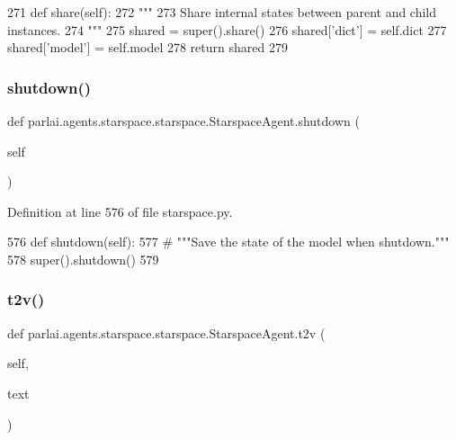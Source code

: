 \begin{DoxyCode}
271     \textcolor{keyword}{def }share(self):
272         \textcolor{stringliteral}{"""}
273 \textcolor{stringliteral}{        Share internal states between parent and child instances.}
274 \textcolor{stringliteral}{        """}
275         shared = super().share()
276         shared[\textcolor{stringliteral}{'dict'}] = self.dict
277         shared[\textcolor{stringliteral}{'model'}] = self.model
278         \textcolor{keywordflow}{return} shared
279 
\end{DoxyCode}
\mbox{\label{classparlai_1_1agents_1_1starspace_1_1starspace_1_1StarspaceAgent_a4016a83cf0ed9ed97c8b94d9eacbcae3}} 
\subsubsection{\texorpdfstring{shutdown()}{shutdown()}}
{\footnotesize\ttfamily def parlai.\+agents.\+starspace.\+starspace.\+Starspace\+Agent.\+shutdown (\begin{DoxyParamCaption}\item[{}]{self }\end{DoxyParamCaption})}



Definition at line 576 of file starspace.\+py.


\begin{DoxyCode}
576     \textcolor{keyword}{def }shutdown(self):
577         \textcolor{comment}{# """Save the state of the model when shutdown."""}
578         super().shutdown()
579 
\end{DoxyCode}
\mbox{\label{classparlai_1_1agents_1_1starspace_1_1starspace_1_1StarspaceAgent_ad38444615578df64d2e341b2ce37a012}} 
\subsubsection{\texorpdfstring{t2v()}{t2v()}}
{\footnotesize\ttfamily def parlai.\+agents.\+starspace.\+starspace.\+Starspace\+Agent.\+t2v (\begin{DoxyParamCaption}\item[{}]{self,  }\item[{}]{text }\end{DoxyParamCaption})}



